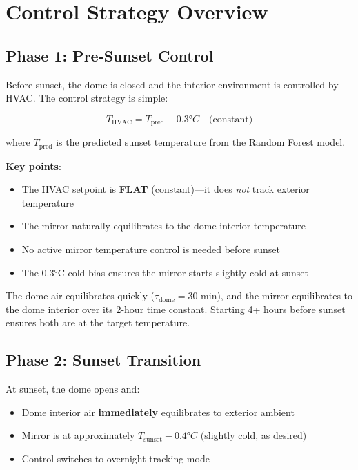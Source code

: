 \documentclass[11pt,letterpaper]{article}
\begin{document}
\section{Control Strategy Overview}

\subsection{Phase 1: Pre-Sunset Control}

Before sunset, the dome is closed and the interior environment is controlled by HVAC. The control strategy is simple:

\begin{equation}
    \boxed{T_\text{HVAC} = T_\text{pred} - 0.3°C \quad \text{(constant)}}
    \label{eq:presunset}
\end{equation}

where $T_\text{pred}$ is the predicted sunset temperature from the Random Forest model.

\textbf{Key points}:
\begin{itemize}
    \item The HVAC setpoint is \textbf{FLAT} (constant)---it does \emph{not} track exterior temperature
    \item The mirror naturally equilibrates to the dome interior temperature
    \item No active mirror temperature control is needed before sunset
    \item The 0.3°C cold bias ensures the mirror starts slightly cold at sunset
\end{itemize}

The dome air equilibrates quickly ($\tau_\text{dome} = 30$ min), and the mirror equilibrates to the dome interior over its 2-hour time constant. Starting 4+ hours before sunset ensures both are at the target temperature.

\subsection{Phase 2: Sunset Transition}

At sunset, the dome opens and:
\begin{itemize}
    \item Dome interior air \textbf{immediately} equilibrates to exterior ambient
    \item Mirror is at approximately $T_\text{sunset} - 0.4°C$ (slightly cold, as desired)
    \item Control switches to overnight tracking mode
\end{itemize}
\end{document}
